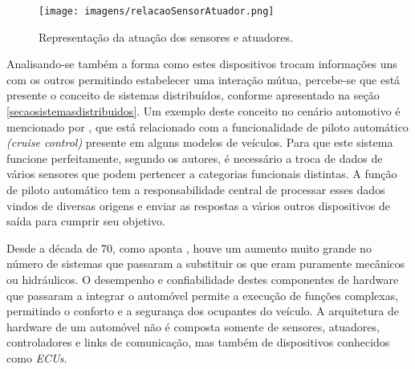 \begin{figure}[!ht]
\centering
\caption{Representação da atuação dos sensores e atuadores.} 
{\texttt{[image: imagens/relacaoSensorAtuador.png]}}\\
 \label{Fig:relacao_sensor_atuador}
\end{figure}

Analisando-se também a forma como estes dispositivos trocam informações uns com os outros permitindo estabelecer uma interação mútua, percebe-se que está presente o conceito de sistemas distribuídos, conforme apresentado na seção \ref{secaosistemasdistribuidos}. Um exemplo deste conceito no cenário automotivo é mencionado por , que está relacionado com a funcionalidade de piloto automático \textit{(cruise control)} presente em alguns modelos de veículos. Para que este sistema funcione perfeitamente, segundo os autores, é necessário a troca de dados de vários sensores que podem pertencer a categorias funcionais distintas. A função de piloto automático tem a responsabilidade central de processar esses dados vindos de diversas origens e enviar as respostas a vários outros dispositivos de saída para cumprir seu objetivo.

Desde a década de 70, como aponta , houve um aumento muito grande no número de sistemas que passaram a substituir os que eram puramente mecânicos ou hidráulicos. O desempenho e confiabilidade destes componentes de hardware que passaram a integrar o automóvel permite a execução de funções complexas, permitindo o conforto e a segurança dos ocupantes do veículo. A arquitetura de hardware de um automóvel não é composta somente de sensores, atuadores, controladores e links de comunicação, mas também de dispositivos conhecidos como \textit{ECUs}.

